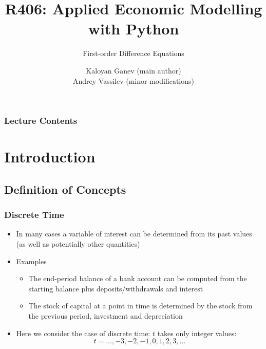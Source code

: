 \documentclass[10pt,usenames,dvipsnames]{beamer}
\title{R406: Applied Economic Modelling with Python}
\subtitle{\textcolor{myred}{First-order Difference Equations}}
\author[Kaloyan Ganev,  Andrey Vassilev]{Kaloyan Ganev (main author) \\
Andrey Vassilev (minor modifications)}
\date{}
\theoremstyle{definition}
\begin{document}
\maketitle

\begin{frame}[fragile]
\frametitle{Lecture Contents}
\tableofcontents
\end{frame}

\section{Introduction}
\subsection{Definition of Concepts}
\begin{frame}[fragile]
\frametitle{Discrete Time}
\begin{itemize}
	\item In many cases a variable of interest can be determined from its past values (as well as potentially other quantities)
	\item Examples
		\begin{itemize}
		\item The end-period balance of a bank account can be computed from the starting balance plus deposits/withdrawals and interest
		\item The stock of capital at a point in time is determined by the stock from the previous period, investment and depreciation
		\end{itemize}
	\item Here we consider the case of discrete time: $t$ takes only integer values:
	\[
		t = \ldots, -3, -2, -1, 0, 1, 2, 3,\ldots
	\]
\end{itemize}
\end{frame}
\end{document}
